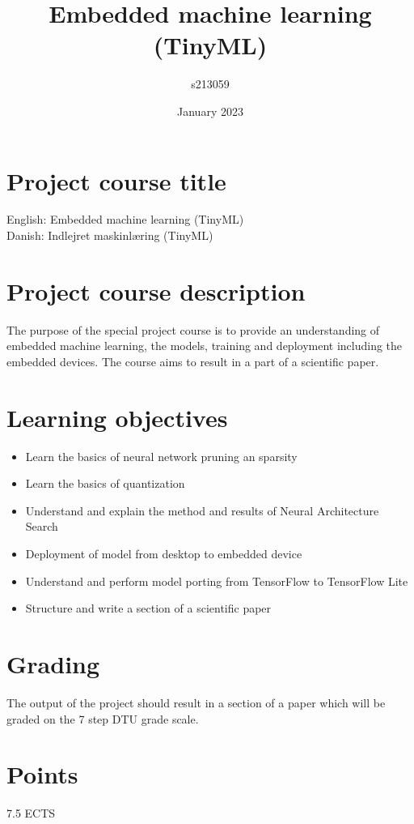 \documentclass{article}
\title{Embedded machine learning (TinyML)}
\author{s213059 }
\date{January 2023}
\begin{document}
\maketitle

\section{Project course title}
English: Embedded machine learning (TinyML)\\
Danish: Indlejret maskinlæring (TinyML)
\section{Project course description}
The purpose of the special project course is to provide an understanding of embedded machine learning, the models, training and deployment including the embedded devices. The course aims to result in a part of a scientific paper.

\section{Learning objectives}

\begin{itemize}

\item Learn the basics of  neural network pruning an sparsity

\item Learn the basics of quantization

\item Understand and explain the method and results of Neural Architecture Search

\item Deployment of model from desktop to embedded device

\item Understand and perform model porting from TensorFlow to TensorFlow Lite

\item Structure and write a section of a scientific paper

\end{itemize}


\section{Grading}
The output of the project should result in a section of a paper which will be graded on the 7 step DTU grade scale.


\section{Points}
7.5 ECTS
\end{document}
